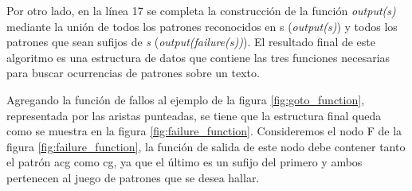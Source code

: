 {Por otro lado, en la línea 17 se completa la construcción de la función {\it output(s)} mediante la unión de todos los patrones reconocidos en s ({\it output(s)}) y todos los patrones que sean sufijos de {\it s} ({\it output(failure(s))}). El resultado final de este algoritmo es una estructura de datos que contiene las tres funciones necesarias para buscar ocurrencias de patrones sobre un texto.
\begin{example*}
Agregando la función de fallos al ejemplo de la figura \ref{fig:goto_function}, representada por las aristas punteadas, se tiene que la estructura final queda como se muestra en la figura  \ref{fig:failure_function}. Consideremos el nodo F de la figura \ref{fig:failure_function}, la función de salida de este nodo debe contener tanto el patrón acg como cg, ya que el último es un sufijo del primero y ambos pertenecen al juego de patrones que se desea hallar.
\begin{figure}[H]
\centering
{}
\end{figure}
\end{example*}}
